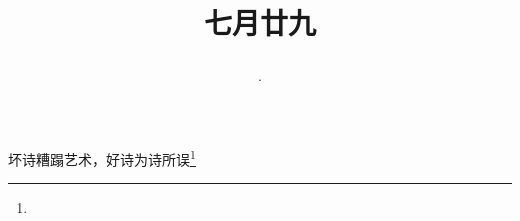 \title{\date[d=1,m=9,y=2024][year:cn-y,年,month:cn,day:cn,日,·,weekday]·七月廿九 }
坏诗糟蹋艺术，好诗为诗所误\footnote{ }

